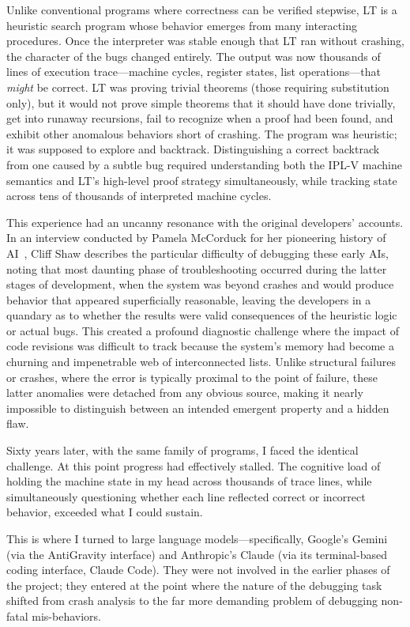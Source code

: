 \documentclass[journal]{IEEEtran}
\begin{document}
Unlike conventional programs where correctness can be verified
stepwise, LT is a heuristic search program whose behavior emerges from
many interacting procedures.  Once the interpreter was stable enough
that LT ran without crashing, the character of the bugs changed
entirely. The output was now thousands of lines of execution
trace---machine cycles, register states, list operations---that
\textit{might} be correct. LT was proving trivial theorems (those
requiring substitution only), but it would not prove simple theorems
that it should have done trivially, get into runaway recursions,
fail to recognize when a proof had been found, and exhibit other
anomalous behaviors short of crashing. The program was heuristic; it
was supposed to explore and backtrack. Distinguishing a correct
backtrack from one caused by a subtle bug required understanding both
the IPL-V machine semantics and LT's high-level proof strategy
simultaneously, while tracking state across tens of thousands of
interpreted machine cycles.

This experience had an uncanny resonance with the original developers'
accounts. In an interview conducted by Pamela McCorduck for her
pioneering history of AI~\cite{mccorduck2004machines}, Cliff Shaw
describes the particular difficulty of debugging these early AIs,
noting that most daunting phase of troubleshooting occurred during the
latter stages of development, when the system was beyond crashes and
would produce behavior that appeared superficially reasonable, leaving
the developers in a quandary as to whether the results were valid
consequences of the heuristic logic or actual bugs. This created a
profound diagnostic challenge where the impact of code revisions was
difficult to track because the system's memory had become a churning
and impenetrable web of interconnected lists. Unlike structural
failures or crashes, where the error is typically proximal to the
point of failure, these latter anomalies were detached from any
obvious source, making it nearly impossible to distinguish between an
intended emergent property and a hidden flaw.\cite{cmuarchiveshawinterview}

Sixty years later, with the same family of programs, I faced
the identical challenge. At this point progress had effectively
stalled. The cognitive load of holding the machine state in my head
across thousands of trace lines, while simultaneously questioning
whether each line reflected correct or incorrect behavior, exceeded
what I could sustain.

This is where I turned to large language models---specifically,
Google's Gemini (via the AntiGravity interface) and Anthropic's Claude
(via its terminal-based coding interface, Claude Code). They were not
involved in the earlier phases of the project; they entered at the
point where the nature of the debugging task shifted from crash
analysis to the far more demanding problem of debugging non-fatal
mis-behaviors.
\end{document}
